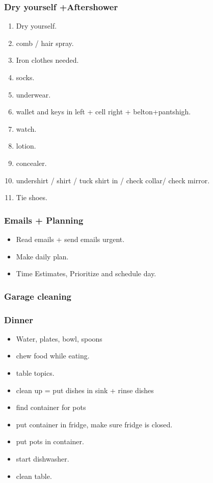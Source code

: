 \begin{frame}
\frametitle{Dry yourself +Aftershower} 
\begin{enumerate} 
\small \item \small Dry yourself. 
\item \small comb / hair spray. 
\item \small Iron clothes needed. 
\item \small socks. 
\item \small underwear. 
\item \small wallet and keys in left + cell right + belton+pantshigh. 
\item \small watch. 
\item \small lotion. 
\item \small concealer. 
\item \small undershirt / shirt / tuck shirt in / check collar/ check mirror. 
\item \small Tie shoes. 
\end{enumerate}
\end{frame}

\begin{frame} 
\frametitle{Emails + Planning} 
\begin{itemize}
\item \tiny Read emails + send emails urgent.  
\item \tiny Make daily plan. 
\item \tiny Time Estimates, Prioritize and schedule day. 
\end{itemize}
\end{frame} 

\begin{frame}
\frametitle{Garage cleaning} 
\end{frame}

\begin{frame}[label=dinnerPrep]
\frametitle{Dinner}
\begin{itemize} 
\small \item \small Water, plates, bowl, spoons 
\item \small chew food while eating. 
\item \small table topics. 
\item \small clean up = put dishes in sink + rinse dishes 
\item \small find container for pots
\item \small put container in fridge, make sure fridge is closed. 
\item \small put pots in container. 
\item \small start dishwasher.  
\item \small clean table. 
\end{itemize} 
\end{frame} 

